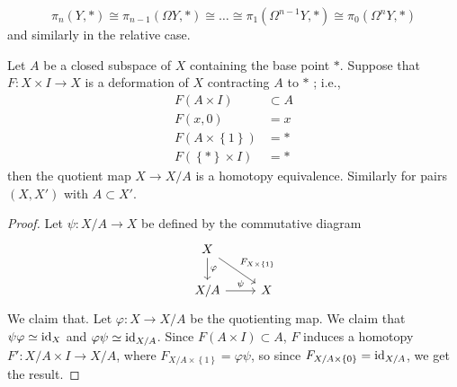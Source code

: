   \begin{corollary}
      \[
      \pi_n\left( Y,* \right) \cong
      \pi_{n-1}\left( \Omega Y, * \right) 
      \cong \ldots \cong
      \pi_1\left( \Omega^{n-1}Y,* \right) 
      \cong \pi_0 \left( \Omega^{n}Y ,* \right) 
      \] 
      and similarly in the relative case.
  \end{corollary}

  \begin{theorem}[]\label{Thm:Bredon-4.5}
      Let $A$ be a closed subspace of $X$ containing the
      base point $*$. Suppose that $F \colon X \times I \to X$ 
      is a deformation of $X$ contracting $A$ to
      $*$ ; i.e.,
      \begin{align*}
          F(A \times I) 
          &\subset A\\
          F(x,0) 
          &= x\\
          F\left( A \times \left\{ 1 \right\}  \right) 
          &= *\\
          F\left( \left\{ * \right\} \times I \right) 
          &= *
      \end{align*}
      then the quotient map $X \to X /A$ is a homotopy equivalence.
      Similarly for pairs $\left( X,X' \right) $ with
      $A \subset X'$.
  \end{theorem}

  \begin{proof}
      Let
      $\psi \colon X / A \to X$ be defined by the
      commutative diagram
      \begin{equation*}
      \begin{tikzcd}
          X \ar[d, "\varphi "] 
          \ar[dr, "F_{X \times \left\{ 1 \right\} } "]& \\
          X / A \ar[r, "\psi"] & X
      \end{tikzcd}
      \end{equation*}
      We claim that. Let $\varphi \colon X \to X / A$ be
      the quotienting map. We claim that
      $\psi \varphi \simeq {\mathrm{id}}_{X}$ and
      $\varphi \psi \simeq {\mathrm{id}}_{X / A}$.
      Since $F\left( A \times I \right) \subset A$, 
      $F$ induces a homotopy
      $F' \colon X / A \times I \to X / A$, where
      $F_{X / A \times \left\{ 1 \right\} }
      = \varphi \psi $, so
      since $F_{X / A \times \left\{ 0 \right\} }
      = {\mathrm{id}}_{X / A}$, we get the result.
  \end{proof}


  \newpage




